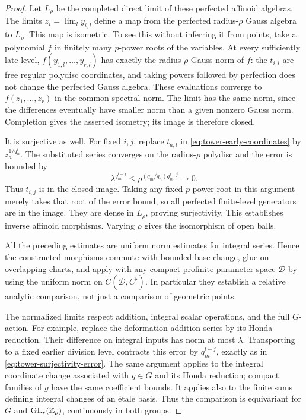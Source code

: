\begin{proof}
Let $L_\rho$ be the completed direct limit of these perfected
affinoid algebras. The limits $z_i=\lim_l y_{i,l}$ define a map from
the perfected radius-$\rho$ Gauss algebra to $L_\rho$. This map is
isometric. To see this without inferring it from points, take a
polynomial $f$ in finitely many $p$-power roots of the variables. At
every sufficiently late level, $f(y_{1,l},\ldots,y_{r,l})$ has
exactly the radius-$\rho$ Gauss norm of $f$: the $t_{i,l}$ are free
regular polydisc coordinates, and taking powers followed by perfection
does not change the perfected Gauss algebra. These evaluations converge
to $f(z_1,\ldots,z_r)$ in the common spectral norm. The limit has the
same norm, since the differences eventually have smaller norm than a
given nonzero Gauss norm. Completion gives the asserted isometry; its
image is therefore closed.

It is surjective as well. For fixed $i,j$, replace $t_{a,l}$ in
\eqref{eq:tower-early-coordinates} by $z_a^{1/q_n^l}$. The
substituted series converges on the radius-$\rho$ polydisc and the
error is bounded by
\begin{equation}\label{eq:tower-surjectivity-error}
 \lambda^{q_m^{l-j}}
 \leq\rho^{(q_m/q_n)q_m^{l-j}}\longrightarrow0.
\end{equation}
Thus $t_{i,j}$ is in the closed image. Taking any fixed $p$-power
root in this argument merely takes that root of the error bound, so
all perfected finite-level generators are in the image. They are
dense in $L_\rho$, proving surjectivity. This establishes inverse
affinoid morphisms. Varying $\rho$ gives the isomorphism of open
balls.

All the preceding estimates are uniform norm estimates for integral
series. Hence the constructed morphisms commute with bounded base
change, glue on overlapping charts, and apply with any compact
profinite parameter space $\mathcal D$ by using the uniform norm on
$C(\mathcal D,C^\flat)$. In particular they establish a relative
analytic comparison, not just a comparison of geometric points.

The normalized limits respect addition, integral scalar operations,
and the full $G$-action. For example, replace the deformation addition
series by its Honda reduction. Their difference on integral inputs
has norm at most $\lambda$. Transporting to a fixed earlier division
level contracts this error by $q_m^{l-j}$, exactly as in
\eqref{eq:tower-surjectivity-error}. The same argument applies to
the integral coordinate change associated with $g\in G$ and its
Honda reduction; compact families of $g$ have the same coefficient
bounds. It applies also to the finite sums defining integral changes
of an \'{e}tale basis. Thus the comparison is equivariant for $G$
and $\operatorname{GL}_r(\mathbb Z_p)$, continuously in both groups.


\end{proof}
